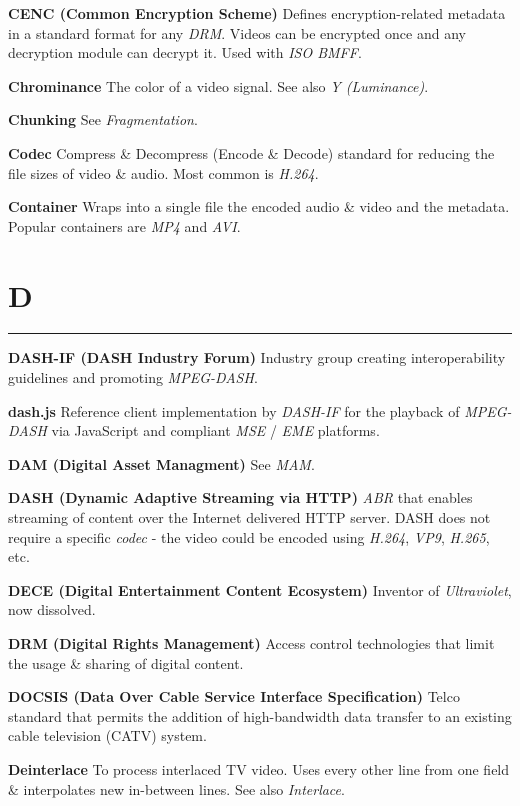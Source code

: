 \smallskip
\textbf{CENC (Common Encryption Scheme)}
Defines encryption-related metadata in a standard format for any \textit{DRM}.  Videos can be encrypted once and any decryption module can decrypt it.  Used with \textit{ISO BMFF}.

\smallskip
\textbf{Chrominance}
The color of a video signal. See also \textit{Y (Luminance)}.

\smallskip
\textbf{Chunking}
See \textit{Fragmentation}.

\smallskip
\textbf{Codec}
Compress \& Decompress (Encode \& Decode) standard for reducing the file sizes of video \& audio. Most common is \textit{H.264}.

\smallskip
\textbf{Container}
Wraps into a single file the encoded audio \& video and the metadata.  Popular containers are \textit{MP4} and \textit{AVI}.

\section{D}
\hrule

\medskip
\textbf{DASH-IF (DASH Industry Forum)}
Industry group creating interoperability guidelines and promoting \textit{MPEG-DASH}.

\smallskip
\textbf{dash.js}
Reference client implementation by \textit{DASH-IF} for the playback of \textit{MPEG-DASH} via JavaScript and compliant \textit{MSE} / \textit{EME} platforms.

\smallskip
\textbf{DAM (Digital Asset Managment)}
See \textit{MAM}.

\smallskip
\textbf{DASH (Dynamic Adaptive Streaming via HTTP)}
\textit{ABR} that enables streaming of content over the Internet delivered HTTP server. DASH does not require a specific \textit{codec} - the video could be encoded using \textit{H.264}, \textit{VP9}, \textit{H.265}, etc.

\smallskip
\textbf{DECE (Digital Entertainment Content Ecosystem)}
Inventor of \textit{Ultraviolet}, now dissolved.

\smallskip
\textbf{DRM (Digital Rights Management)}
Access control technologies that limit the usage \& sharing of digital content.

\smallskip
\textbf{DOCSIS (Data Over Cable Service Interface Specification)}
Telco standard that permits the addition of high-bandwidth data transfer to an existing cable television (CATV) system.

\smallskip
\textbf{Deinterlace}
To process interlaced TV video. Uses every other line from one field \& interpolates new in-between lines. See also \textit{Interlace}.

